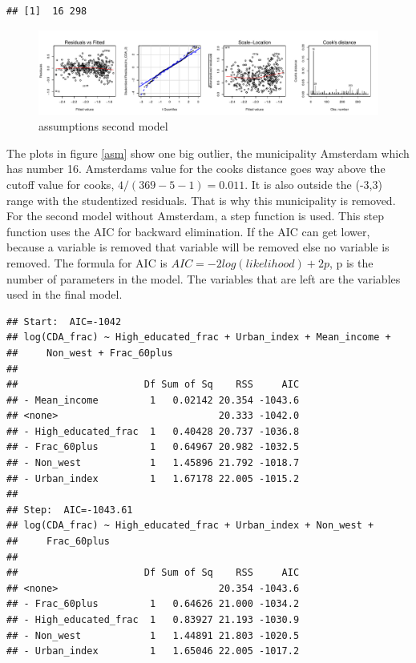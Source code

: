 \documentclass[11pt,]{article}
\begin{document}
\begin{verbatim}
## [1]  16 298
\end{verbatim}

\begin{figure}[H]

{\centering \includegraphics{lm_part_report_files/figure-latex/unnamed-chunk-3-1} 

}

\caption{\label{asm}assumptions second model}\label{fig:unnamed-chunk-3}
\end{figure}

The plots in figure \ref{asm} show one big outlier, the municipality
Amsterdam which has number 16. Amsterdams value for the cooks distance
goes way above the cutoff value for cooks, \(4/(369-5-1)=0.011\). It is
also outside the (-3,3) range with the studentized residuals. That is
why this municipality is removed.\\
For the second model without Amsterdam, a step function is used. This
step function uses the AIC for backward elimination. If the AIC can get
lower, because a variable is removed that variable will be removed else
no variable is removed. The formula for AIC is
\(AIC=-2log(likelihood)+2p\), p is the number of parameters in the
model. The variables that are left are the variables used in the final
model.

\begin{verbatim}
## Start:  AIC=-1042
## log(CDA_frac) ~ High_educated_frac + Urban_index + Mean_income + 
##     Non_west + Frac_60plus
## 
##                      Df Sum of Sq    RSS     AIC
## - Mean_income         1   0.02142 20.354 -1043.6
## <none>                            20.333 -1042.0
## - High_educated_frac  1   0.40428 20.737 -1036.8
## - Frac_60plus         1   0.64967 20.982 -1032.5
## - Non_west            1   1.45896 21.792 -1018.7
## - Urban_index         1   1.67178 22.005 -1015.2
## 
## Step:  AIC=-1043.61
## log(CDA_frac) ~ High_educated_frac + Urban_index + Non_west + 
##     Frac_60plus
## 
##                      Df Sum of Sq    RSS     AIC
## <none>                            20.354 -1043.6
## - Frac_60plus         1   0.64626 21.000 -1034.2
## - High_educated_frac  1   0.83927 21.193 -1030.9
## - Non_west            1   1.44891 21.803 -1020.5
## - Urban_index         1   1.65046 22.005 -1017.2
\end{verbatim}
\end{document}
